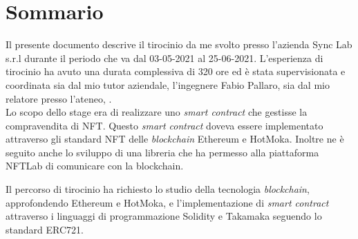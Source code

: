 
\cleardoublepage
{}
{}
\begingroup
\let\clearpage\relax
\let\cleardoublepage\relax
\let\cleardoublepage\relax

\chapter*{Sommario}

Il presente documento descrive il tirocinio da me svolto presso l'azienda Sync Lab s.r.l durante il periodo che va dal 03-05-2021 al 25-06-2021.
L'esperienza di tirocinio ha avuto una durata complessiva di 320 ore ed è stata supervisionata e coordinata sia dal mio tutor aziendale, l'ingegnere Fabio Pallaro, sia dal mio relatore presso l'ateneo, \profTitle{} \myProf. \\

\noindent Lo scopo dello stage era di realizzare uno \textit{smart contract} che gestisse la compravendita di NFT. Questo \textit{smart contract} doveva essere implementato attraverso gli standard NFT delle \textit{blockchain} Ethereum e HotMoka. Inoltre ne è seguito anche lo sviluppo di una libreria che ha permesso alla piattaforma NFTLab di comunicare con la blockchain.

\noindent Il percorso di tirocinio ha richiesto lo studio della tecnologia \textit{blockchain}, approfondendo Ethereum e HotMoka, e l'implementazione di \textit{smart contract} attraverso i linguaggi di programmazione Solidity e Takamaka seguendo lo standard ERC721. \\

